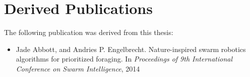 
\chapter{Derived Publications}
\label{app:derived_publications}

The following publication was derived from this thesis:
\begin{itemize}
	\item Jade Abbott, and Andries P. Engelbrecht. Nature-inspired swarm robotics algorithms for prioritized foraging. In \textit{Proceedings of 9th International Conference on Swarm Intelligence}, 2014
\end{itemize}

